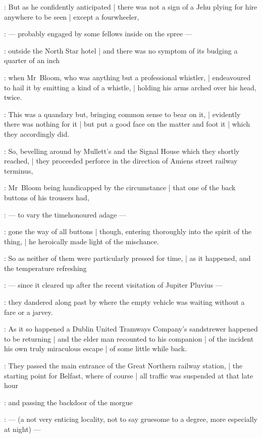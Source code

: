 :
But as he confidently anticipated |
there was not a sign of a Jehu plying for hire anywhere to be seen |
except a fourwheeler,

:
    --- probably engaged by some fellows inside on the spree ---

:
outside the North Star hotel |
and there was no symptom of its budging a quarter of an inch

:
when Mr~Bloom, who was anything but a professional whistler, |
endeavoured to hail it by emitting a kind of a whistle, |
holding his arms arched over his head, twice.

:
This was a quandary but, bringing common sense to bear on it, |
evidently there was nothing for it |
but put a good face on the matter and foot it |
which they accordingly did.

:
So, bevelling around by Mullett's and the Signal House which they shortly reached, |
they proceeded perforce in the direction of Amiens street railway terminus,

:
Mr~Bloom being handicapped by the circumstance |
that one of the back buttons of his trousers had,

:
    --- to vary the timehonoured adage ---

:
gone the way of all buttons |
though, entering thoroughly into the spirit of the thing, |
he heroically made light of the mischance.

:
So as neither of them were particularly pressed for time, |
as it happened, and the temperature refreshing

:
    --- since it cleared up after the recent visitation of Jupiter Pluvius ---

:
they dandered along past by where the empty vehicle was waiting without a fare or a jarvey.

:
As it so happened a Dublin United Tramways Company's sandstrewer happened to be returning |
and the elder man recounted to his companion |
 of the incident his own truly miraculous escape |
of some little while back.

:
They passed the main entrance of the Great Northern railway station, |
the starting point for Belfast, where of course |
all traffic was suspended at that late hour

:
and passing the backdoor of the morgue

:
    --- (a not very enticing locality, not to say gruesome to a degree,
        more especially at night) ---

